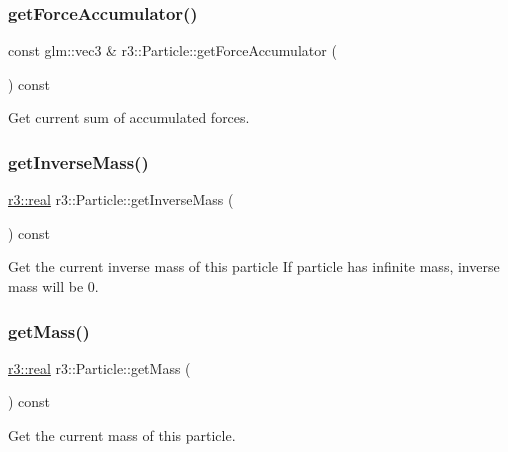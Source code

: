 \subsubsection{\texorpdfstring{get\+Force\+Accumulator()}{getForceAccumulator()}}
{\footnotesize\ttfamily const glm\+::vec3 \& r3\+::\+Particle\+::get\+Force\+Accumulator (\begin{DoxyParamCaption}{ }\end{DoxyParamCaption}) const}

Get current sum of accumulated forces. \mbox{\label{classr3_1_1_particle_ac495537e7d4089fa394abb3fed213b93}} 
\subsubsection{\texorpdfstring{get\+Inverse\+Mass()}{getInverseMass()}}
{\footnotesize\ttfamily \mbox{\hyperlink{namespacer3_ab2016b3e3f743fb735afce242f0dc1eb}{r3\+::real}} r3\+::\+Particle\+::get\+Inverse\+Mass (\begin{DoxyParamCaption}{ }\end{DoxyParamCaption}) const}

Get the current inverse mass of this particle If particle has infinite mass, inverse mass will be 0. \mbox{\label{classr3_1_1_particle_a589224b38f870653d35fc2fa0aae1e25}} 
\subsubsection{\texorpdfstring{get\+Mass()}{getMass()}}
{\footnotesize\ttfamily \mbox{\hyperlink{namespacer3_ab2016b3e3f743fb735afce242f0dc1eb}{r3\+::real}} r3\+::\+Particle\+::get\+Mass (\begin{DoxyParamCaption}{ }\end{DoxyParamCaption}) const}

Get the current mass of this particle. \mbox{\label{classr3_1_1_particle_a6f61c64625f2d9bf7fe1145d74790a92}} 
